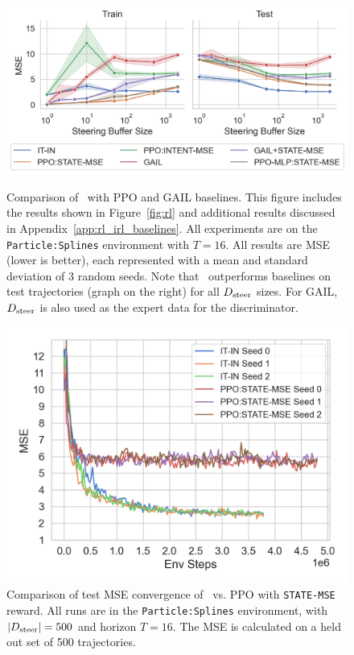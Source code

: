 \documentclass[nohyperref]{article}
\begin{document}
\begin{figure}[H]
    \centering
    \vspace{-1em}
    \begin{minipage}{1\textwidth}
        \centering
        \includegraphics[width=0.7\columnwidth,keepaspectratio]{figures/iclr_plots/algos_comparison_icml_all.png}
        \caption{Comparison of \methodname\ with PPO and GAIL baselines. This figure includes the results shown in Figure~\ref{fig:rl} and additional results discussed in Appendix~\ref{app:rl_irl_baselines}. All experiments are on the \texttt{Particle:Splines} environment with $T=16$. All results are MSE (lower is better), each represented with a mean and standard deviation of 3 random seeds. Note that \methodname\ outperforms baselines on test trajectories (graph on the right) for all $D_{\mathrm{steer}}$ sizes. For GAIL, $D_{\mathrm{steer}}$ is also used as the expert data for the discriminator. }
        \label{fig:rl_appendix}
    \end{minipage}
    \begin{minipage}{1\textwidth}
        \centering
        \includegraphics[scale=0.5]{figures/iclr_plots/it-in_vs_rl_training_curves.png}
        \caption{Comparison of test MSE convergence of \methodname\ vs. PPO with \texttt{STATE-MSE} reward. All runs are in the \texttt{Particle:Splines} environment, with $|D_{\mathrm{steer}}|=500$ and horizon $T=16$. The MSE is calculated on a held out set of 500 trajectories. }
        \label{fig:training_curves}
    \end{minipage}
\end{figure}
\end{document}
